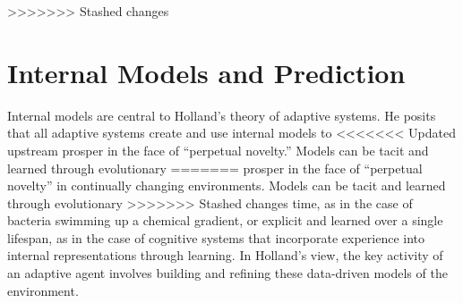 \documentclass{sig-alternate}
\begin{document}
>>>>>>> Stashed changes





\section{Internal Models and Prediction}


Internal models are central to Holland's theory of adaptive systems.
He posits that all adaptive systems create and use internal models to
<<<<<<< Updated upstream
prosper in the face of ``perpetual novelty.'' 
Models can be tacit and learned through evolutionary
=======
prosper in the face of ``perpetual novelty'' in continually changing
environments.  Models can be tacit and learned through evolutionary
>>>>>>> Stashed changes
time, as in the case of bacteria swimming up a chemical gradient, or
explicit and learned over a single lifespan, as in the case of
cognitive systems that incorporate experience into internal
representations through learning.  In Holland's view, the key activity
of an adaptive agent involves building and refining these data-driven
models of the environment.
\end{document}
